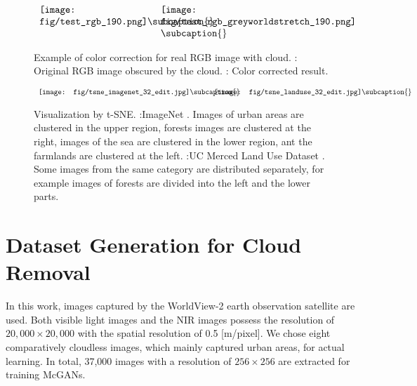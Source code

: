 \documentclass[10pt,twocolumn,letterpaper]{article}
\begin{document}
\begin{figure}[!t]
\begin{center}

$\begin{array}{p{40mm}p{40mm}}
\hspace*{0mm}\texttt{[image: fig/test\_rgb\_190.png]}\subcaption{}\label{fig:synthesis_colorcorrect:before}
&\hspace*{0mm}\texttt{[image: fig/test\_rgb\_greyworldstretch\_190.png]}
\subcaption{}\label{fig:synthesis_colorcorrect:after}
\end{array}$

\caption{Example of color correction for real RGB image with cloud. \protect{}: Original RGB image obscured by the cloud. \protect{}: Color corrected result.}
\label{fig:synthesis_colorcorrect}

\end{center}
\end{figure}

\begin{figure*}[!t]
\begin{center}

$\begin{array}{p{80mm}p{80mm}}
\hspace*{0mm}\texttt{[image: fig/tsne\_imagenet\_32\_edit.jpg]}\subcaption{}\label{fig:t-sne:imagenet}
&\hspace*{0mm}\texttt{[image: fig/tsne\_landuse\_32\_edit.jpg]}\subcaption{}\label{fig:t-sne:uc}
\end{array}$
\vspace{-3mm}
\caption{Visualization by t-SNE. \protect{}:ImageNet \protect\cite{deng2009imagenet}. Images of urban areas are clustered in the upper region, forests images are clustered at the right, images of the sea are clustered in the lower region, ant the farmlands are clustered  at the left. \protect{}:UC Merced Land Use Dataset \protect\cite{yang2010bag}. Some images from the same category are distributed separately, for example images of forests are divided into the left and  the lower parts. }
\label{fig:t-sne}

\end{center}
\end{figure*}

\section{Dataset Generation for Cloud Removal}
\label{sec:cloud_dataset}
In this work, images captured by the WorldView-2 earth observation satellite are used. Both visible light images and the NIR images possess the resolution of $20,000 \times 20,000$ with the spatial resolution of 0.5 [m/pixel].  We chose eight comparatively cloudless images, which mainly captured urban areas, for actual learning.  In total, 37,000 images with a resolution of $256 \times 256$ are extracted for training McGANs.
\end{document}
